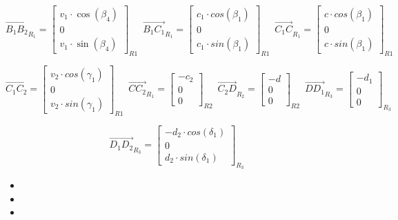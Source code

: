 \documentclass[12pt,a4paper]{article}
\begin{document}
\begin{equation}
\vec{B_1 B_2}_{R_{1}}=
\begin{bmatrix}
v_1\cdot \cos(\beta_4) \\
0\\
v_1\cdot \sin(\beta_4)
\end{bmatrix}_{R1} \enspace
\vec{B_1 C_1}_{R_{1}}=
\begin{bmatrix}
c_1\cdot cos(\beta_1) \\
0\\
c_1\cdot sin(\beta_1)
\end{bmatrix}_{R1} \enspace
\vec{C_1 C}_{R_{1}}=
\begin{bmatrix}
c\cdot cos(\beta_1) \\
0\\
c\cdot sin(\beta_1)
\end{bmatrix}_{R1} \enspace
\end{equation}

\begin{equation}
\vec{C_1 C_2}=
\begin{bmatrix}
v_2\cdot cos(\gamma_1) \\
0\\
v_2 \cdot sin(\gamma_1)
\end{bmatrix}_{R1} \enspace
\vec{C C_2}_{R_{1}}=
\begin{bmatrix}
-c_2\\
0\\
0
\end{bmatrix}_{R2} \enspace
\vec{C_2 D}_{R_2}=
\begin{bmatrix}
-d\\
0\\
0
\end{bmatrix}_{R2} \enspace
\vec{D D_1}_{R_3}=
\begin{bmatrix}
- d_1\\
0\\
0
\end{bmatrix}_{R_3} \enspace
\end{equation}

\begin{equation}
\vec{D_1 D_2}_{R_3}=
\begin{bmatrix}
-d_2 \cdot cos(\delta_1)\\
0\\
d_2 \cdot sin(\delta_1)
\end{bmatrix}_{R_3} \enspace
\end{equation}

\begin{itemize}
	\item
	\item 
	\item 
\end{itemize}
\end{document}
